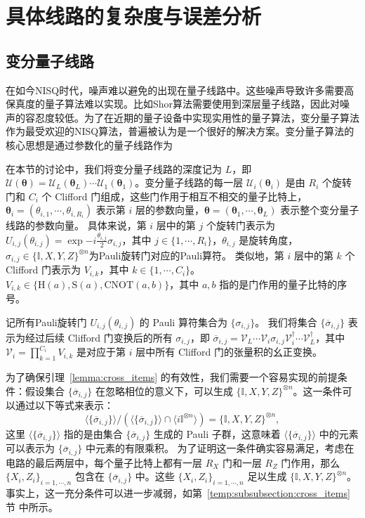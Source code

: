 \chapter{具体线路的复杂度与误差分析}

\section{变分量子线路}
在如今NISQ时代，噪声难以避免的出现在量子线路中。这些噪声导致许多需要高保真度的量子算法难以实现。比如Shor算法需要使用到深层量子线路，因此对噪声的容忍度较低。为了在近期的量子设备中实现实用性的量子算法，变分量子算法作为最受欢迎的NISQ算法，普遍被认为是一个很好的解决方案。变分量子算法的核心思想是通过参数化的量子线路作为

在本节的讨论中，我们将变分量子线路的深度记为 $L$，即 $\mathcal{U}(\bm{\theta})=\mathcal{U}_L(\bm{\theta}_L)\cdots\mathcal{U}_1(\bm{\theta}_1)$。变分量子线路的每一层 $\mathcal{U}_i(\bm{\theta}_i)$ 是由 $R_i$ 个旋转门和 $C_i$ 个 Clifford 门组成，这些门作用于相互不相交的量子比特上，$\bm{\theta}_i=(\theta_{i,1},\cdots,\theta_{i,R_i})$ 表示第 $i$ 层的参数向量，$\bm{\theta}=(\bm{\theta}_1,\cdots,\bm{\theta}_L)$ 表示整个变分量子线路的参数向量。
具体来说，第 $i$ 层中的第 $j$ 个旋转门表示为 $U_{i, j}(\theta_{i,j})=\exp{-i \frac{\theta_{i,j}}{2} \sigma_{i,j}}$，其中 $j \in \{1, \cdots , R_i\}$，$\theta_{i,j}$ 是旋转角度，$\sigma_{i, j}\in \{\mathbb{I}, X,Y,Z\}^{\otimes n}$为Pauli旋转门对应的Pauli算符。
类似地，第 $i$ 层中的第 $k$ 个 Clifford 门表示为 $V_{i,k}$，其中 $k \in \{1, \cdots , C_i\}$。$V_{i,k}\in\{\mathrm{H}(a),\mathrm{S}(a),\mathrm{CNOT}(a,b)\}$，其中 $a,b $ 指的是门作用的量子比特的序号。

记所有Pauli旋转门 $U_{i,j}(\theta_{i,j})$ 的 Pauli 算符集合为 $\{\sigma_{i,j}\}$。
我们将集合 $\{\overline{\sigma}_{i,j}\}$ 表示为经过后续 Clifford 门变换后的所有 $\sigma_{i,j}$，即 $\overline{\sigma}_{i,j}= \mathcal{V}_{L} \cdots \mathcal{V}_{i} \sigma_{i,j} \mathcal{V}_{i}^\dagger \cdots \mathcal{V}_{L}^\dagger$，其中 $\mathcal{V}_{i} = \prod_{k=1}^{C_i} V_{i,k}$ 是对应于第 $i$ 层中所有 Clifford 门的张量积的幺正变换。

为了确保引理~\ref{lemma:cross_items} 的有效性，我们需要一个容易实现的前提条件：假设集合 $\{\overline{\sigma}_{i,j}\}$ 在忽略相位的意义下，可以生成 $\{\mathbb{I}, X, Y, Z\}^{\otimes n}$。这一条件可以通过以下等式来表示：
\begin{equation}\label{eq:generate}
  \langle \{\overline{\sigma}_{i,j}\}\rangle/\left(\langle \{\overline{\sigma}_{i,j}\}\rangle\cap\langle i\mathbb{I}^{\otimes n}\rangle\right)=\{\mathbb{I},X,Y,Z\}^{\otimes n},
\end{equation}
这里 $\langle \{\overline{\sigma}_{i,j}\} \rangle$ 指的是由集合 $\{\overline{\sigma}_{i,j}\}$ 生成的 Pauli 子群，这意味着 $\langle \{\overline{\sigma}_{i,j}\}\rangle$ 中的元素可以表示为 $\{\overline{\sigma}_{i,j}\}$ 中元素的有限乘积。
为了证明这一条件确实容易满足，考虑在电路的最后两层中，每个量子比特上都有一层 $R_X$ 门和一层 $R_Z$ 门作用，那么 $\{X_i, Z_i\}_{i=1,\cdots,n}$ 包含在 $\{\overline{\sigma}_{i,j}\}$ 中。这些 $\{ X_i,Z_i \}_{i=1,\cdots,n}$ 足以生成 $\{\mathbb{I},X,Y,Z\}^{\otimes n}$。事实上，这一充分条件可以进一步减弱，如第~\ref{temp:subsubsection:cross_items}节 中所示。


